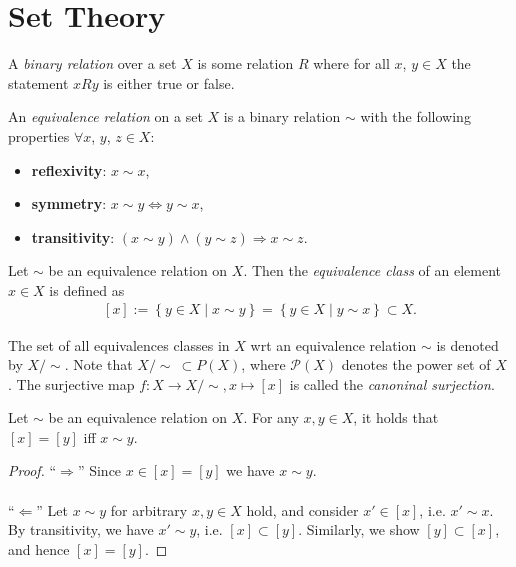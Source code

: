 \section{Set Theory}
\begin{defn}
	A \textit{binary relation} over a set $X$ is some relation $R$ where for all $x$, $y\in X$ the statement $xRy$ is either true or false. 
\end{defn}

\begin{defn}\label{defn:equivalence_relation}
	An \textit{equivalence relation} on a set $X$ is a binary relation $\sim$ with the following properties $\forall x$, $y$, $z \in X$: 
	\begin{itemize}
		\item \textbf{reflexivity}: $x\sim x$, 
		\item \textbf{symmetry}: $x \sim y\Leftrightarrow y\sim x$, 
		\item  \textbf{transitivity}: $\left(x\sim y\right) \wedge \left(y\sim z\right)\Rightarrow x\sim z$.  
	\end{itemize}
\end{defn}

\begin{defn}\label{defn:equivalence_class}
	Let $\sim$ be an equivalence relation on $X$. Then the \textit{equivalence class} of an element $x\in X$ is defined as 
	\begin{align}
		\left[x\right] := \left\{y\in X \mid x\sim y \right\} = \left\{ y\in X \mid y\sim x \right\} \subset X. 
	\end{align}
	
	The set of all equivalences classes in $X$ wrt an equivalence relation $\sim$ is denoted by $X/\sim$. Note that $X/\sim\ \subset P(X)$, where $\mathcal P(X)$ denotes the power set of $X$ \cite{src:quotient_set_X_by_equivalence_relation}. The surjective map $f: X\rightarrow X/\sim, x\mapsto [x]$ is called the \textit{canoninal surjection}.
\end{defn}

\begin{theorem}\label{thrm:characterization_equivalence_classes}
	Let $\sim$ be an equivalence relation on $X$. For any $x, y\in X$, it holds that $[x] = [y]$ iff $x\sim y$.
\end{theorem}

\begin{proof}
	\enquote{$\Longrightarrow$} Since $x\in[x] = [y]$ we have $x\sim y$.
	\\ \\
	\enquote{$\Longleftarrow$} Let $x\sim y$ for arbitrary $x, y\in X$ hold, and consider $x'\in [x]$, i.e. $x'\sim x$. By transitivity, we have $x' \sim y$, i.e. $[x] \subset [y]$. Similarly, we show $[y]\subset [x]$, and hence $[x] = [y]$.
\end{proof}

